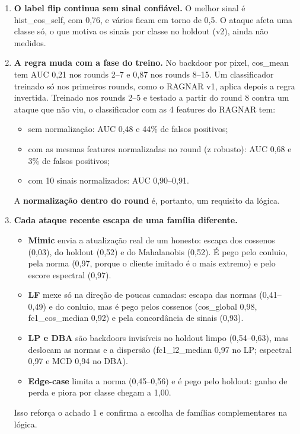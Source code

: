 \documentclass[11pt,a4paper]{article}
\begin{document}
\begin{enumerate}
  \item \textbf{O label flip continua sem sinal confiável.} O melhor sinal é hist\_cos\_self, com 0,76, e
        vários ficam em torno de 0,5. O ataque afeta uma classe só, o que motiva os sinais por classe no
        holdout (v2), ainda não medidos.

  \item \textbf{A regra muda com a fase do treino.} No backdoor por pixel, cos\_mean tem AUC 0,21 nos
        rounds 2--7 e 0,87 nos rounds 8--15. Um classificador treinado só nos primeiros rounds, como o
        RAGNAR v1, aplica depois a regra invertida. Treinado nos rounds 2--5 e testado a partir do round 8
        contra um ataque que não viu, o classificador com as 4 features do RAGNAR tem:
        \begin{itemize}
          \item sem normalização: AUC 0,48 e 44\% de falsos positivos;
          \item com as mesmas features normalizadas no round (z robusto): AUC 0,68 e 3\% de falsos
                positivos;
          \item com 10 sinais normalizados: AUC 0,90--0,91.
        \end{itemize}
        A \textbf{normalização dentro do round} é, portanto, um requisito da lógica.

  \item \textbf{Cada ataque recente escapa de uma família diferente.}
        \begin{itemize}
          \item \textbf{Mimic} envia a atualização real de um honesto: escapa dos cossenos (0,03), do
                holdout (0,52) e do Mahalanobis (0,52). É pego pelo conluio, pela norma (0,97, porque o
                cliente imitado é o mais extremo) e pelo escore espectral (0,97).
          \item \textbf{LF} mexe só na direção de poucas camadas: escapa das normas (0,41--0,49) e do
                conluio, mas é pego pelos cossenos (cos\_global 0,98, fc1\_cos\_median 0,92) e pela
                concordância de sinais (0,93).
          \item \textbf{LP e DBA} são backdoors invisíveis no holdout limpo (0,54--0,63), mas
                deslocam as normas e a dispersão (fc1\_l2\_median 0,97 no LP; espectral 0,97 e MCD 0,94
                no DBA).
          \item \textbf{Edge-case} limita a norma (0,45--0,56) e é pego pelo holdout: ganho de perda e
                piora por classe chegam a 1,00.
        \end{itemize}
        Isso reforça o achado 1 e confirma a escolha de famílias complementares na lógica.
\end{enumerate}
\end{document}
